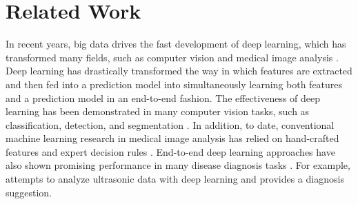 

\section{Related Work}

In recent years, big data drives the fast development of deep learning, which has transformed many fields, such as computer vision and medical image analysis \cite{Han_2020_CVPR_Workshops,liu2019deep,liu2020symmetric}. Deep learning has drastically transformed the way in which features are extracted and then fed into a prediction model into simultaneously learning both features and a prediction model in an end-to-end fashion. The effectiveness of deep learning has been demonstrated in many computer vision tasks, such as classification, detection, and segmentation \cite{Liu_2019_ICCV,liu2020identity,liu2018dependency,liu2019permutation}. In addition, to date, conventional machine learning research in medical image analysis has relied on hand-crafted features \cite{maraci2017framework,liu2018joint,liu2017line} and expert decision rules \cite{de2018clinically}. End-to-end deep learning approaches have also shown promising performance in many disease diagnosis tasks \cite{liu2019unimodal,liu2018ordinal}. For example, \cite{litjens2019state} attempts to analyze ultrasonic data with deep learning and provides a diagnosis suggestion. 





